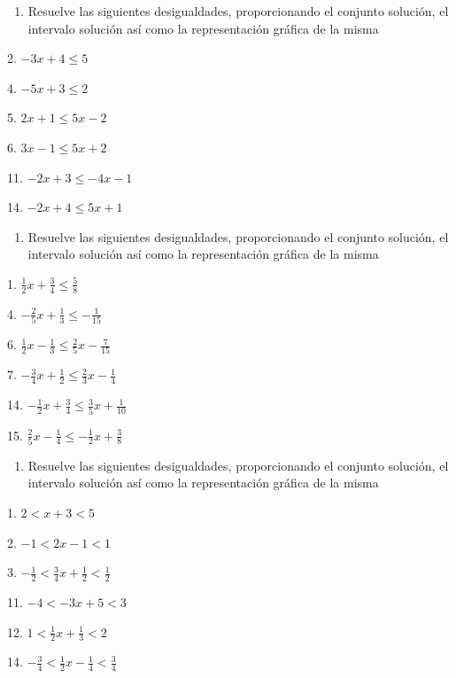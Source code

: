 \documentclass[]{book}
\providecommand{\tightlist}{%
  \setlength{\itemsep}{0pt}\setlength{\parskip}{0pt}}
\begin{document}
\begin{enumerate}
\def\labelenumi{\arabic{enumi}.}
\setcounter{enumi}{11}
\tightlist
\item
  Resuelve las siguientes desigualdades, proporcionando el conjunto
  solución, el intervalo solución así como la representación gráfica de
  la misma
\end{enumerate}

\begin{multicols}{2}
2. $-3x + 4 \leq 5$

4. $-5x + 3 \leq 2$

5. $2x + 1 \leq 5x - 2$

6. $3x - 1 \leq 5x + 2$

11. $-2x + 3 \leq -4x - 1$

14. $-2x + 4 \leq 5x + 1$
\end{multicols}

\begin{enumerate}
\def\labelenumi{\arabic{enumi}.}
\setcounter{enumi}{12}
\tightlist
\item
  Resuelve las siguientes desigualdades, proporcionando el conjunto
  solución, el intervalo solución así como la representación gráfica de
  la misma
\end{enumerate}

\begin{multicols}{2}
1. $\frac{1}{2}x + \frac{3}{4} \leq \frac{5}{8}$

4. $-\frac{2}{5}x + \frac{1}{3} \leq -\frac{1}{15}$

6. $\frac{1}{2}x - \frac{1}{3} \leq \frac{2}{5}x - \frac{7}{15}$

7. $-\frac{3}{4}x + \frac{1}{2} \leq \frac{2}{3}x - \frac{1}{4}$

14. $-\frac{1}{2}x + \frac{3}{4} \leq \frac{3}{5}x + \frac{1}{10}$

15. $\frac{2}{5}x - \frac{1}{4} \leq -\frac{1}{2}x + \frac{3}{8}$
\end{multicols}

\begin{enumerate}
\def\labelenumi{\arabic{enumi}.}
\setcounter{enumi}{13}
\tightlist
\item
  Resuelve las siguientes desigualdades, proporcionando el conjunto
  solución, el intervalo solución así como la representación gráfica de
  la misma
\end{enumerate}

\begin{multicols}{2}
1. $2<x+3<5$

2. $-1<2x-1<1$

3. $-\frac{1}{2}<\frac{3}{4}x+\frac{1}{2}<\frac{1}{2}$

11. $-4< -3x+5<3$

12. $1<\frac{1}{2}x+\frac{1}{3}<2$

14. $-\frac{3}{4}<\frac{1}{2}x-\frac{1}{4}<\frac{3}{4}$
\end{multicols}
\end{document}
